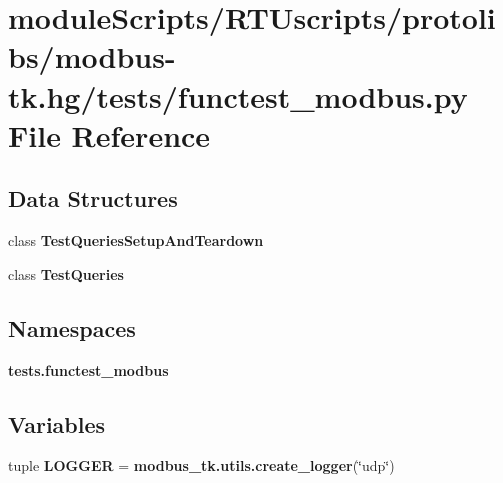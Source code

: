 \section{module\+Scripts/\+R\+T\+Uscripts/protolibs/modbus-\/tk.hg/tests/functest\+\_\+modbus.py File Reference}
\label{functest__modbus_8py}
\subsection*{Data Structures}
\begin{DoxyCompactItemize}
\item 
class {\bf Test\+Queries\+Setup\+And\+Teardown}
\item 
class {\bf Test\+Queries}
\end{DoxyCompactItemize}
\subsection*{Namespaces}
\begin{DoxyCompactItemize}
\item 
 {\bf tests.\+functest\+\_\+modbus}
\end{DoxyCompactItemize}
\subsection*{Variables}
\begin{DoxyCompactItemize}
\item 
tuple {\bf L\+O\+G\+G\+E\+R} = {\bf modbus\+\_\+tk.\+utils.\+create\+\_\+logger}(\char`\"{}udp\char`\"{})
\end{DoxyCompactItemize}
